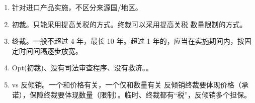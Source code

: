 \begin{enumerate}
\begin{enumerate}
\begin{enumerate}
                \end{enumerate}
          \item 针对进口产品实施，不区分来源国/地区。
          \item 初裁。只能采用提高关税的方式。终裁可以采用提高关税 \hz 数量限制的方式。
          \item 终裁。一般不超过 4 年，最长 10 年。超过 1 年的，应当在实施期间内，按固定时间间隔逐步放宽。
          \item Opt(初裁)、没有司法审查程序、没有救济。。
          \item vs 反倾销。一个和价格有关，一个仅和数量有关 \yjt
                反倾销终裁要体现价格（承诺），保障终裁要体现数量（限制）。临时、终裁都有“税”，反倾销多个担保。
        \end{enumerate}
\end{enumerate}

